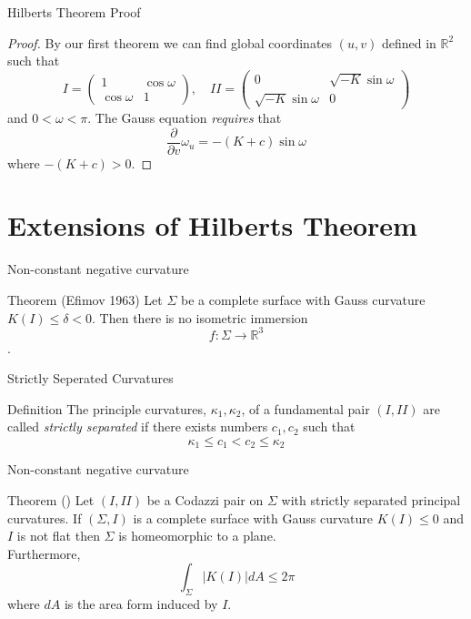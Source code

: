 \begin{frame}[c]{Hilberts Theorem Proof}
	\begin{proof}
		By our first theorem we can find global coordinates $(u, v)$ defined in $\mathbb{R}^2$ such that
		$$I =\begin{pmatrix}
				1           & \cos \omega \\
				\cos \omega & 1
			\end{pmatrix}, \quad II = \begin{pmatrix}
				0                    & \sqrt{-K}\sin \omega \\
				\sqrt{-K}\sin \omega & 0
			\end{pmatrix}$$
		and $0< \omega < \pi$. The Gauss equation \emph{requires} that
		$$\frac{\partial}{\partial v}\omega_{u} = -(K+c)\sin \omega$$
		where $-(K+ c) > 0$.
	\end{proof}
\end{frame}

\section{Extensions of Hilberts Theorem}
\frame[c]{\sectionpage}

\begin{frame}[c]{Non-constant negative curvature}
	\begin{kulblock}{Theorem (Efimov 1963)}
		Let $\Sigma$ be a complete surface with Gauss curvature $K(I) \leq \delta < 0$. Then there is no isometric immersion
		$$ f : \Sigma \to \mathbb{R}^3$$.
	\end{kulblock}
\end{frame}

\begin{frame}[c]{Strictly Seperated Curvatures}
	\begin{kulblock}{Definition}
		The principle curvatures, $\kappa_1,\kappa_2$, of a fundamental pair $(I, II)$ are called \emph{strictly separated} if there exists numbers $c_1,c_2$ such that
		$$\kappa_1 \leq c_1 < c_2  \leq \kappa_2$$
	\end{kulblock}
\end{frame}

\begin{frame}[c]{Non-constant negative curvature}
	\begin{kulblock}{Theorem (\cite{GALVEZ20151058})}
		Let $(I,II)$ be a Codazzi pair on $\Sigma$ with strictly separated principal curvatures. If $(\Sigma, I)$ is a
		complete surface with Gauss curvature $K(I) \leq 0$ and $I$ is not flat then $\Sigma$ is homeomorphic to a plane. \\

		Furthermore, $$\int_{\Sigma}^{} |K(I)|dA \leq 2 \pi$$ where $dA$ is the area
		form induced by $I$.
	\end{kulblock}
\end{frame}

